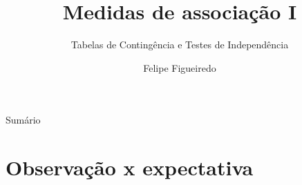 \documentclass{beamer}
\title%
{Medidas de associação I}
\subtitle
{Tabelas de Contingência e Testes de Independência} %
\author%
{Felipe Figueiredo}%
\institute[INTO] %
{Instituto Nacional de Traumatologia e Ortopedia
}
\date%
{}
\begin{document}
\begin{frame}
  \titlepage
\end{frame}

\begin{frame}{Sumário}
  \tableofcontents
\end{frame}









\section{Observação x expectativa}
\end{document}
